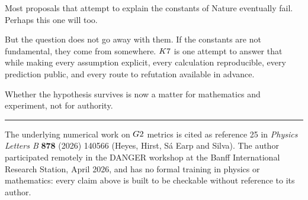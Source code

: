 \documentclass[11pt,a4paper]{article}
\begin{document}
Most proposals that attempt to explain the constants of Nature eventually
fail. Perhaps this one will too.

But the question does not go away with them. If the constants are not
fundamental, they come from somewhere. $K7$ is one attempt to answer
that while making every assumption explicit, every calculation
reproducible, every prediction public, and every route to refutation
available in advance.

Whether the hypothesis survives is now a matter for mathematics and
experiment, not for authority.

\vspace{1.5em}
\noindent\rule{\textwidth}{0.2pt}

{\footnotesize\noindent The underlying numerical work on $G2$ metrics
is cited as reference 25 in \emph{Physics Letters B} \textbf{878} (2026)
140566 (Heyes, Hirst, S\'a Earp and Silva). The author participated
remotely in the DANGER workshop at the Banff International Research
Station, April 2026, and has no formal training in physics or mathematics:
every claim above is built to be checkable without reference to its
author.\par}
\end{document}
